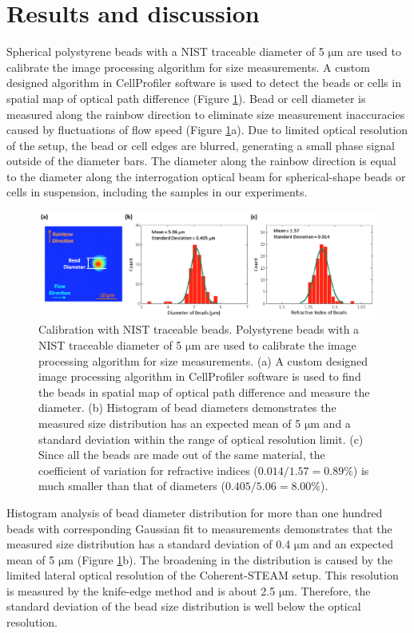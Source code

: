 \section{Results and discussion}
Spherical polystyrene beads with a NIST traceable diameter of 5 $\mathrm{\mu}$m are used to calibrate the image processing algorithm for size measurements. A custom designed algorithm in CellProfiler software \cite{carpenter2006cellprofiler} is used to detect the beads or cells in spatial map of optical path difference (Figure \ref{fig:BOE2013_Figure3}). Bead or cell diameter is measured along the rainbow direction to eliminate size measurement inaccuracies caused by fluctuations of flow speed (Figure \ref{fig:BOE2013_Figure3}a). Due to limited optical resolution of the setup, the bead or cell edges are blurred, generating a small phase signal outside of the diameter bars. The diameter along the rainbow direction is equal to the diameter along the interrogation optical beam for spherical-shape beads or cells in suspension, including the samples in our experiments. 

\begin{figure}[htb!]
\centering
\includegraphics[scale=1]{BOE2013/Figure3.png}
\caption{Calibration with NIST traceable beads. Polystyrene beads with a NIST traceable diameter of 5 $\mathrm{\mu}$m are used to calibrate the image processing algorithm for size measurements. (a) A custom designed image processing algorithm in CellProfiler software is used to find the beads in spatial map of optical path difference and measure the diameter. (b) Histogram of bead diameters demonstrates the measured size distribution has an expected mean of 5 $\mathrm{\mu}$m and a standard deviation within the range of optical resolution limit. (c) Since all the beads are made out of the same material, the coefficient of variation for refractive indices ($0.014/1.57 = 0.89\%$) is much smaller than that of diameters ($0.405/5.06 = 8.00\%$).}
\label{fig:BOE2013_Figure3}
\end{figure}

Histogram analysis of bead diameter distribution for more than one hundred beads with corresponding Gaussian fit to measurements demonstrates that the measured size distribution has a standard deviation of 0.4 $\mathrm{\mu}$m and an expected mean of 5 $\mathrm{\mu}$m (Figure \ref{fig:BOE2013_Figure3}b). The broadening in the distribution is caused by the limited lateral optical resolution of the Coherent-STEAM setup. This resolution is measured by the knife-edge method and is about 2.5 $\mathrm{\mu}$m. Therefore, the standard deviation of the bead size distribution is well below the optical resolution.

